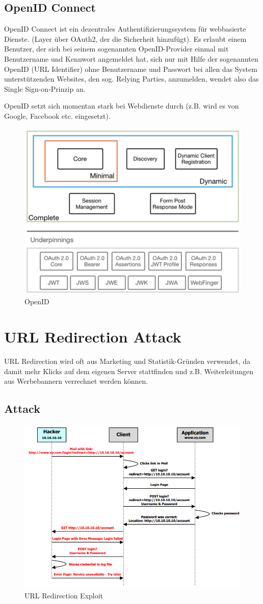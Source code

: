 \subsection{OpenID Connect}
OpenID Connect ist ein dezentrales Authentifizierungssystem für webbasierte Dienste. (Layer über OAuth2, der die Sicherheit hinzufügt). Es erlaubt einem Benutzer, der sich bei seinem sogenannten OpenID-Provider einmal mit Benutzername und Kennwort angemeldet hat, sich nur mit Hilfe der sogenannten OpenID (URL Identifier) ohne Benutzername und Passwort bei allen das System unterstützenden Websites, den sog. Relying Parties, anzumelden, wendet also das Single Sign-on-Prinzip an.

OpenID setzt sich momentan stark bei Webdienste durch (z.B. wird es von Google, Facebook etc. eingesetzt).

\begin{figure}[h!]
	\centering
	\includegraphics[width=0.5\linewidth]{images/openid}
	\caption{OpenID}
	\label{fig:openid}
\end{figure}


\section{URL Redirection Attack}
URL Redirection wird oft aus Marketing und Statistik-Gründen verwendet, da damit mehr Klicks auf dem eigenen Server stattfinden und z.B. Weiterleitungen aus Werbebannern verrechnet werden können.

\subsection{Attack}
\begin{figure}[h!]
	\centering
	\includegraphics[width=0.7\linewidth]{images/url-redirection}
	\caption{URL Redirection Exploit}
	\label{fig:url-redirection}
\end{figure}

